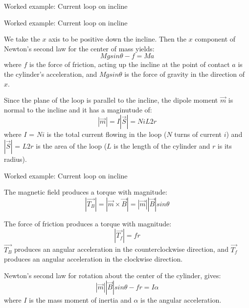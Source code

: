 {\begin{frame}{Worked example: Current loop on incline}
\end{frame}

%
%
%

\begin{frame}{Worked example: Current loop on incline}

  We take the $x$ axis to be positive down the incline.
  Then the $x$ component of Newton's second law for the center of mass yields:
  \begin{equation*}
  	M g sin\theta - f = M a
  \end{equation*}
  where $f$ is the force of friction, acting up the incline at the point of contact
  $a$ is the cylinder's acceleration, and $M g sin\theta$ is the force of gravity
  in the direction of $x$.

  Since the plane of the loop is parallel to the incline, the dipole moment $\vec{m}$
  is normal to the incline and it has a maginutude of:
  \begin{equation*}
  	|\vec{m}| = I |\vec{S}| = N i L 2r
  \end{equation*}
  where $I$ = $Ni$ is the total current flowing in the loop ($N$ turns of current $i$)
  and $|\vec{S}|$ = $L 2r$ is the area of the loop ($L$ is the length of the cylinder
  and $r$ is its radius).

\end{frame}

%
%
%

\begin{frame}{Worked example: Current loop on incline}

  The magnetic field produces a torque with magnitude:
  \begin{equation*}
  	|\vec{T_B}| = |\vec{m} \times \vec{B}| = |\vec{m}| |\vec{B}| sin\theta
  \end{equation*}

  The force of friction produces a torque with magnitude:
  \begin{equation*}
  	|\vec{T_f}| = f r
  \end{equation*}
  $\vec{T_B}$ produces an angular acceleration in the counterclockwise direction,
  and $\vec{T_f}$ produces an angular acceleration in the clockwise direction.\\

  \vspace{0.2cm}

  Newton's second law for rotation about the center of the cylinder, gives:
  \begin{equation*}
  	|\vec{m}| |\vec{B}| sin\theta - f r = I \alpha
  \end{equation*}
  where $I$ is the mass moment of inertia and
  $\alpha$ is the angular acceleration.\\


\end{frame}}
